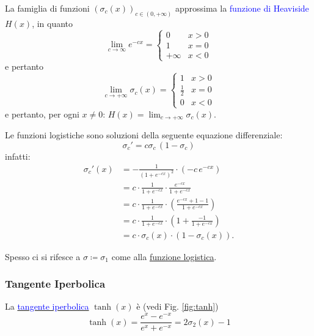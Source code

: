 \documentclass[10pt]{book}
\newcommand{\1}{\mathds{1}}
\theoremstyle{definition}%
\theoremstyle{plain}
\theoremstyle{remark}
\renewcommand{\href}[2]{\textcolor{blue}{#2}}
\begin{document}
La famiglia di funzioni \((\sigma_{c}(x))_{c \in (0,+\infty)}\) approssima la \href{../../../../../org/roam/20250624161413-funzione_di_heaviside.org}{funzione di Heaviside} \(H(x)\), in quanto
\begin{equation*}
\lim_{c\to \infty} e^{-cx} = \begin{cases}
0 & x>0\\
1 & x=0\\
+ \infty & x<0
\end{cases}
\end{equation*}
e pertanto
\begin{equation*}
\lim_{c\to+\infty} \sigma_{c}(x) = \begin{cases}
1 &x>0\\
\frac{1}{2} & x=0\\
0 &x<0
\end{cases}
\end{equation*}
e pertanto, per ogni \(x\neq 0\): \(H(x) =\lim_{c\to+\infty}\sigma_{c}(x)\).

Le funzioni logistiche sono soluzioni della seguente equazione differenziale:
\begin{equation*}
\sigma_{c}' = c\sigma_{c}\,(1-\sigma_{c})
\end{equation*}
infatti:
\begin{align*}
\sigma_{c}'(x) &= - \frac{1}{(1+e^{-cx})^{2}} \cdot (-c\,e^{-cx})\\
&= c \cdot \frac{1}{1+e^{-cx}} \cdot \frac{e^{-cx}}{1+e^{-cx}}\\
&= c \cdot \frac{1}{1+e^{-cx}} \cdot \left(\frac{e^{-cx}+1-1}{1+e^{-cx}}\right)\\
&= c \cdot \frac{1}{1+e^{-cx}} \cdot \left(1+\frac{-1}{1+e^{-cx}}\right)\\
&= c\cdot \sigma_{c}(x) \cdot (1-\sigma_{c}(x)).
\end{align*}

Spesso ci si rifesce a \(\sigma\coloneqq \sigma_{1}\) come alla \uline{funzione logistica}.
\subsubsection{Tangente Iperbolica}
\label{sec:org5209844}

La \uline{\href{../../../../../org/roam/20250627184228-funzioni_iperboliche.org}{tangente iperbolica}} \(\tanh(x)\) è (vedi Fig. \ref{fig:tanh})
\begin{equation*}
\tanh(x) = \frac{e^{x}-e^{-x}}{e^{x}+e^{-x}} = 2\sigma_{2}(x)-1
\end{equation*}
\end{document}
